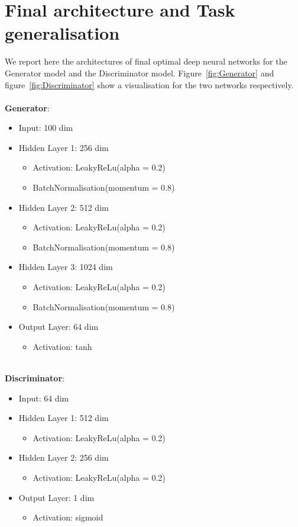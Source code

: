 \section{Final architecture and Task generalisation}
We report here the architectures of final optimal deep neural networks for the Generator model and the Discriminator model. Figure~\ref{fig:Generator} and figure~\ref{fig:Discriminator} show a visualisation for the two networks respectively.\\\\
\textbf{Generator}:
\begin{itemize}[noitemsep]
	\item Input: 100 dim
	\item Hidden Layer 1: 256 dim
	\begin{itemize}[noitemsep,topsep=0pt]
		\item Activation: LeakyReLu(alpha = 0.2)
		\item BatchNormalisation(momentum = 0.8)
	\end{itemize}
	\item Hidden Layer 2: 512 dim
	\begin{itemize}[noitemsep,topsep=0pt]
		\item Activation: LeakyReLu(alpha = 0.2)
		\item BatchNormalisation(momentum = 0.8)
	\end{itemize}
		\item Hidden Layer 3: 1024 dim
	\begin{itemize}[noitemsep,topsep=0pt]
		\item Activation: LeakyReLu(alpha = 0.2)
		\item BatchNormalisation(momentum = 0.8)
	\end{itemize}
	\item Output Layer: 64 dim
	\begin{itemize}[noitemsep,topsep=0pt]
		\item Activation: tanh
	\end{itemize}
\end{itemize}
\phantom\\
\textbf{Discriminator}:
\begin{itemize}[noitemsep]
	\item Input: 64 dim
	\item Hidden Layer 1: 512 dim
	\begin{itemize}[noitemsep,topsep=0pt]
		\item Activation: LeakyReLu(alpha = 0.2)
	\end{itemize}
	\item Hidden Layer 2: 256 dim
	\begin{itemize}[noitemsep,topsep=0pt]
		\item Activation: LeakyReLu(alpha = 0.2)
	\end{itemize}
	\item Output Layer: 1 dim
	\begin{itemize}[noitemsep,topsep=0pt]
		\item Activation: sigmoid
	\end{itemize}
\end{itemize}


